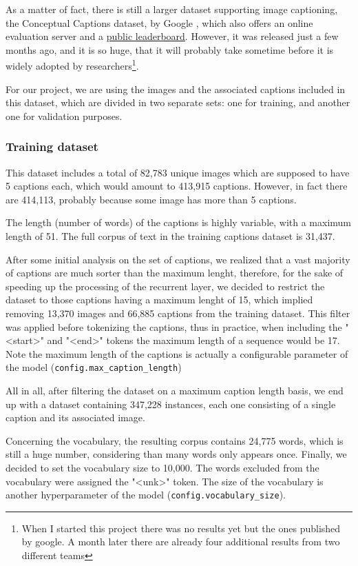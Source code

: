 As a matter of fact, there is still a larger dataset supporting image captioning, the Conceptual Captions dataset, by Google  \citep{Sharma2018}, which also offers an online evaluation server and a \href{https://ai.google.com/research/ConceptualCaptions/leaderboard?active_tab=leaderboard}{public leaderboard}. However, it was released just a few months ago, and it is so huge, that it will probably take sometime before it is widely adopted by researchers\footnote{When I started this project there was no results yet but the ones published by google. A month later there are already four additional results from two different teams}.

For our project, we are using the images and the associated captions included in this dataset, which are divided in two separate sets: one for training, and another one for validation purposes.

\subsubsection{Training dataset}

This dataset includes a total of 82,783 unique images which are supposed to have 5 captions each, which would amount to 413,915 captions. However, in fact there are 414,113, probably because some image has more than 5 captions.

The length (number of words) of the captions is highly variable, with a maximum length of 51. The full corpus of text in the training captions dataset is 31,437.

After some initial analysis on the set of captions, we realized that a vast majority of captions are much sorter than the maximum lenght, therefore, for the sake of speeding up the processing of the recurrent layer, we decided to restrict the dataset to those captions having a maximum lenght of 15, which implied removing  13,370 images and 66,885 captions from the training dataset. This filter was applied before tokenizing the captions, thus in practice, when including the "<start>" and "<end>" tokens the maximum length of a sequence would be 17. Note the maximum length of the captions is actually a configurable parameter of the model (\lstinline{config.max_caption_length})

All in all, after filtering the dataset on a maximum caption length basis, we end up with a dataset containing 347,228 instances, each one consisting of a single caption and its associated image.

Concerning the vocabulary, the resulting corpus contains 24,775 words, which is still a huge number, considering than many words only appears once. Finally, we decided to set the vocabulary size to 10,000. The words excluded from the vocabulary were assigned the "<unk>" token. The size of the vocabulary is another hyperparameter of the model (\lstinline{config.vocabulary_size}).



